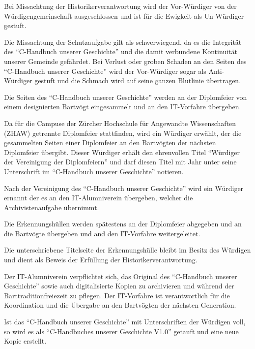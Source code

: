 \documentclass[fontsize=12pt,parskip=half]{scrartcl}
\begin{document}
\begin{contract}
  Bei Missachtung der Historikerverantwortung  wird der Vor-Würdiger von der Würdigengemeinschaft ausgeschlossen und ist für die Ewigkeit als
  Un-Würdiger gestuft.

  \Clause[title={Anti-Würdige}]
  Die Missachtung der Schutzaufgabe  gilt als schwerwiegend, da es die Integrität des ``C-Handbuch unserer Geschichte'' und die
  damit verbundene Kontinuität unserer Gemeinde gefährdet. Bei Verlust oder groben Schaden an den Seiten des ``C-Handbuch unserer Geschichte'' wird der Vor-Würdiger sogar als
  Anti-Würdiger gestuft und die Schmach wird auf seine ganzen Blutlinie übertragen.

  \Clause[title={Einsammlung}]\label{H.einsammlung}
  Die Seiten des ``C-Handbuch unserer Geschichte'' werden an der Diplomfeier von einem designierten Bartvögt eingesammelt und an den IT-Vorfahre übergeben.

  Da für die Campuse der Zürcher Hochschule für Angewandte Wissenschaften (ZHAW) getrennte Diplomfeier stattfinden, wird ein Würdiger erwählt, der die gesammelten
  Seiten einer Diplomfeier an den Bartvögten der nächsten Diplomfeier übergibt. Dieser Würdiger erhält den ehrenvollen Titel ``Würdiger der Vereinigung der Diplomfeiern'' und darf
  diesen Titel mit Jahr unter seine Unterschrift im ``C-Handbuch unserer Geschichte'' notieren.

  Nach der Vereinigung des ``C-Handbuch unserer Geschichte'' wird ein Würdiger ernannt der es an den IT-Alumniverein übergeben, welcher die Archivistenaufgabe  übernimmt.

  Die Erkennungshüllen werden spätestens an der Diplomfeier abgegeben und an die Bartvögte übergeben und and den IT-Vorfahre weitergeleitet.

  Die unterschriebene Titelseite der Erkennungshülle bleibt im Besitz des Würdigen und dient als Beweis der Erfüllung der Historikerverantwortung.

  \Clause[title={Archivistenaufgabe}]\label{H.archivistenaufgabe}
  Der IT-Alumniverein verpflichtet sich, das Original des ``C-Handbuch unserer Geschichte'' sowie auch digitalisierte Kopien zu archivieren und während der Barttraditionfreiezeit
  zu pflegen. Der IT-Vorfahre ist verantwortlich für die Koordination und die Übergabe an den Bartvögten der nächsten Generation.

  Ist das ``C-Handbuch unserer Geschichte'' mit Unterschriften der Würdigen voll, so wird es als ``C-Handbuches unserer Geschichte V1.0'' getauft und eine neue Kopie erstellt.


\end{contract}
\end{document}
